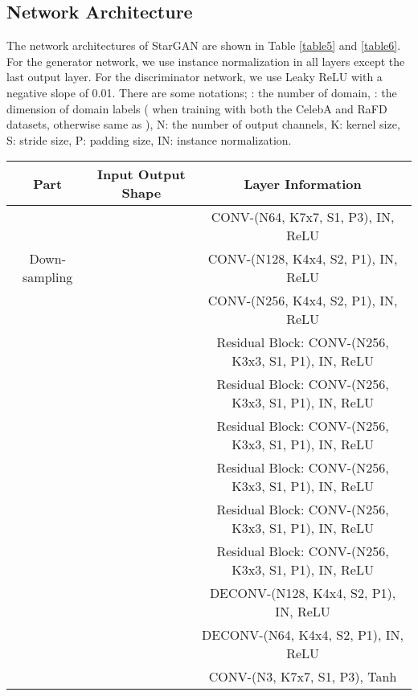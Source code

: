 \documentclass[10pt,twocolumn,letterpaper]{article}
\begin{document}
\medskip

\subsection{Network Architecture} \label{section7_2}
The network architectures of StarGAN are shown in Table \ref{table5} and \ref{table6}.  For the generator network, we use instance normalization in all layers except the last output layer. For the discriminator network, we use Leaky ReLU with a negative slope of 0.01. There are some notations; : the number of domain, : the dimension of domain labels ( when training with both the CelebA and RaFD datasets, otherwise same as ), N: the number of output channels, K: kernel size, S: stride size, P: padding size, IN: instance normalization.

\medskip



\begin{table*}[h]
\setlength{\tabcolsep}{13pt}
\renewcommand{\arraystretch}{1.7}
\begin{center}
\begin{tabular}{c  c  c}
Part & Input  Output Shape & Layer Information \\
\hline \hline
\multirow{3}{*}{Down-sampling} &  & CONV-(N64, K7x7, S1, P3), IN, ReLU \\
&  & CONV-(N128, K4x4, S2, P1), IN, ReLU \\
&  & CONV-(N256, K4x4, S2, P1), IN, ReLU \\
\Xhline{1.0pt}
\multirow{6}{*}{Bottleneck} &  & Residual Block: CONV-(N256, K3x3, S1, P1), IN, ReLU\\
 &  &  Residual Block: CONV-(N256, K3x3, S1, P1), IN, ReLU \\
 &  &   Residual Block: CONV-(N256, K3x3, S1, P1), IN, ReLU  \\
 &  &   Residual Block: CONV-(N256, K3x3, S1, P1), IN, ReLU  \\
 &  &   Residual Block: CONV-(N256, K3x3, S1, P1), IN, ReLU  \\
 &  &   Residual Block: CONV-(N256, K3x3, S1, P1), IN, ReLU  \\
\Xhline{1.0pt}
\multirow{3}{*}{Up-sampling} &  & DECONV-(N128, K4x4, S2, P1), IN, ReLU \\
 &  & DECONV-(N64, K4x4, S2, P1), IN, ReLU \\
 &  & CONV-(N3, K7x7, S1, P3), Tanh \\
\hline
\hline
\end{tabular}
\end{center}
\caption{Generator network architecture}
\label{table5}
\end{table*}
\end{document}
